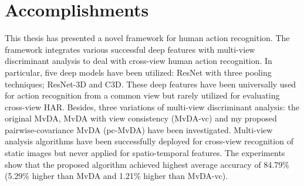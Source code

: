
\section{Accomplishments}
    This thesis has presented a novel framework for human action recognition.
    The framework integrates various successful deep features with multi-view discriminant analysis to deal with cross-view human action recognition.
    In particular, five deep models have been utilized: ResNet with three pooling techniques; ResNet-3D and C3D.
    These deep features have been universally used for action recognition from a common view but rarely utilized for evaluating cross-view HAR.
    Besides, three variations of multi-view discriminant analysis: the original MvDA, MvDA with view consistency (MvDA-vc) and my proposed pairwise-covariance MvDA (pc-MvDA) have been investigated.
    Multi-view analysis algorithms have been successfully deployed for cross-view recognition of static images but never applied for spatio-temporal features.
    The experiments show that the proposed algorithm achieved highest average accuracy of 84.79\% (5.29\% higher than MvDA and 1.21\% higher than MvDA-vc).
